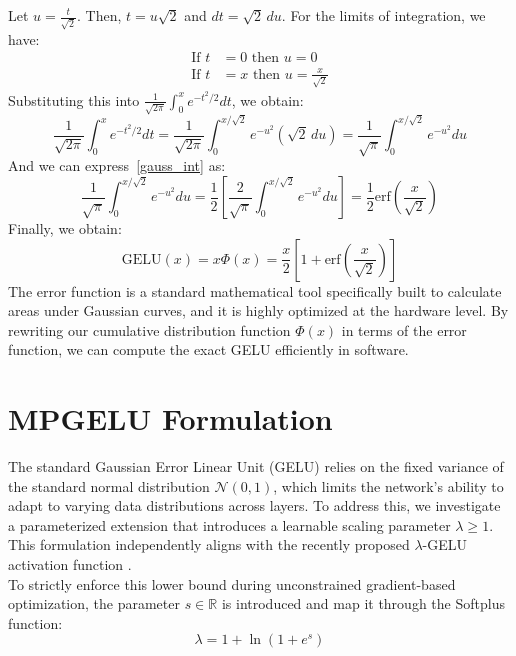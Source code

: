 \documentclass[11pt]{article}
\begin{document}
Let $u = \frac{t}{\sqrt{2}}$. Then, $t = u\sqrt{2}$ and $dt = \sqrt{2} \, du$. 
For the limits of integration, we have:
\begin{equation*}
\begin{aligned}
\text{If } t &= 0 \text{ then } u = 0 \\
\text{If } t &= x \text{ then } u = \frac{x}{\sqrt{2}}
\end{aligned}
\end{equation*}
Substituting this into $\frac{1}{\sqrt{2\pi}} \int_{0}^{x} e^{-t^2/2} dt$, we obtain:
\begin{equation}
\frac{1}{\sqrt{2\pi}} \int_{0}^{x} e^{-t^2/2} dt 
= \frac{1}{\sqrt{2\pi}} \int_{0}^{x/\sqrt{2}} e^{-u^2} (\sqrt{2} \, du) 
= \frac{1}{\sqrt{\pi}} \int_{0}^{x/\sqrt{2}} e^{-u^{2}} du 
\label{gauss_int}
\end{equation}
And we can express~\eqref{gauss_int} as:
\begin{equation*}
\frac{1}{\sqrt{\pi}} \int_{0}^{x/\sqrt{2}} e^{-u^{2}} du = \frac{1}{2} \left[ \frac{2}{\sqrt{\pi}} \int_{0}^{x/\sqrt{2}} e^{-u^{2}} du \right] = \frac{1}{2}\text{erf}\left(\frac{x}{\sqrt{2}}\right) 
\end{equation*}
Finally, we obtain:
\begin{equation*}
\text{GELU}(x) = x\Phi(x) =  \frac{x}{2}\left[1 + \text{erf}\left( \frac{x}{\sqrt{2}}\right) \right]
\end{equation*}
\noindent The error function is a standard mathematical tool specifically built to calculate areas under Gaussian curves, and it is highly optimized at the hardware level. By rewriting our cumulative distribution function $\Phi(x)$ in terms of the error function, we can compute the exact GELU efficiently in software.
\section{MPGELU Formulation}

\noindent The standard Gaussian Error Linear Unit (GELU) relies on the fixed variance of the standard normal distribution $\mathcal{N}(0, 1)$, which limits the network's ability to adapt to varying data distributions across layers. To address this, we investigate a parameterized extension that introduces a learnable scaling parameter $\lambda \geq 1$. This formulation independently aligns with the recently proposed $\lambda$-GELU activation function \cite{perezcorral2026lambdagelu}.\\

\noindent To strictly enforce this lower bound during unconstrained gradient-based optimization, the parameter $s \in \mathbb{R}$ is introduced and map it through the Softplus function:
\begin{equation*}
\lambda = 1 + \ln(1 + e^s)
\end{equation*}
\end{document}
